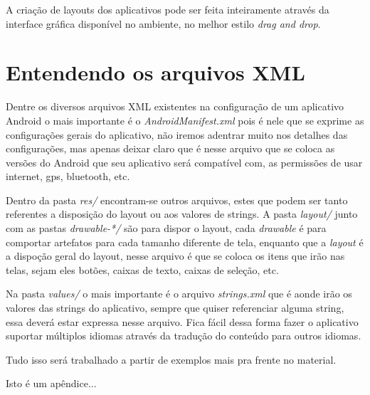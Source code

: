 \documentclass[a4paper,12pt,brazil,doubleside]{book}
\begin{document}
A criação de layouts dos aplicativos pode ser feita inteiramente através da interface gráfica disponível no ambiente, no melhor estilo \textit{drag and drop}. 

\section{Entendendo os arquivos XML}
Dentre os diversos arquivos XML existentes na configuração de um aplicativo Android o mais importante é o \textit{AndroidManifest.xml} pois é nele que se exprime as configurações gerais do aplicativo, não iremos adentrar muito nos detalhes das configurações, mas apenas deixar claro que é nesse arquivo que se coloca as versões do Android que seu aplicativo será compatível com, as permissões de usar internet, gps, bluetooth, etc. 

Dentro da pasta \textit{res/} encontram-se outros arquivos, estes que podem ser tanto referentes a disposição do layout ou aos valores de strings. A pasta \textit{layout/} junto com as pastas \textit{drawable-*/} são para dispor o layout, cada \textit{drawable} é para comportar artefatos para cada tamanho diferente de tela, enquanto que a \textit{layout} é a dispoção geral do layout, nesse arquivo é que se coloca os itens que irão nas telas, sejam eles botões, caixas de texto, caixas de seleção, etc.

Na pasta \textit{values/} o mais importante é o arquivo \textit{strings.xml} que é aonde irão os valores das strings do aplicativo, sempre que quiser referenciar alguma string, essa deverá estar expressa nesse arquivo. Fica fácil dessa forma fazer o aplicativo suportar múltiplos idiomas através da tradução do conteúdo para outros idiomas. 

Tudo isso será trabalhado a partir de exemplos mais pra frente no material.


\begin{singlespace}



\end{singlespace}



\singlespace
{}
\cleardoublepage
\thispagestyle{empty}
{}


\doublespace


\appendix
{} %

Isto é um apêndice...

\end{document}
